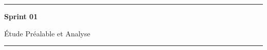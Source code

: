 \newpage
\thispagestyle{empty}
\vspace*{\fill}
\begin{center}
\rule{0.8\textwidth}{0.5pt}

\vspace{1cm}
{\Huge\bfseries Sprint 01}

\vspace{0.5cm}
{\LARGE Étude Préalable et Analyse}
\vspace{1cm}

\rule{0.8\textwidth}{0.5pt}
\end{center}
\vspace*{\fill}
\newpage
